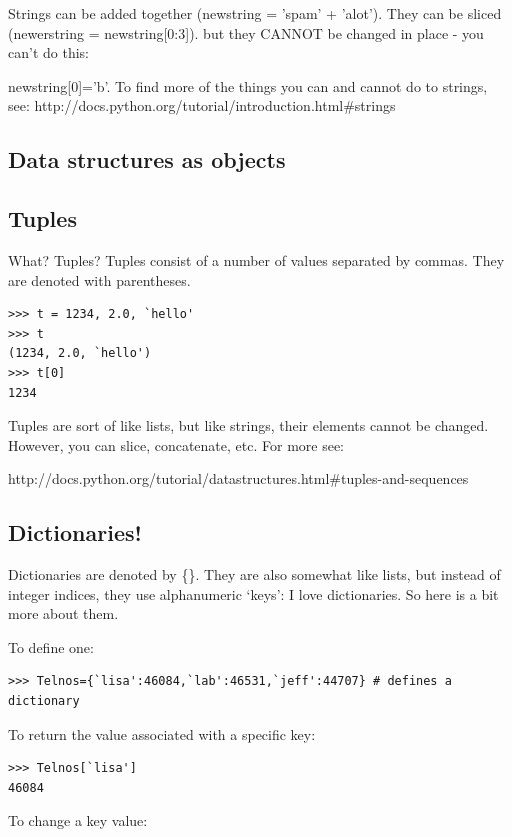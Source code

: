 \documentclass[11pt]{book}
\begin{document}
Strings can be added together ({\color{blue}newstring = 'spam' + 'alot'}).  They  can be sliced ({\color{blue}newerstring = newstring[0:3]}). 
but they CANNOT be changed in place - you can't do this: {{\color{blue}newstring[0]='b'}.
To find more of the things you can and cannot do to strings, see: http://docs.python.org/tutorial/introduction.html\#strings

\subsection{Data structures as objects}



\subsection{Tuples}
What?  Tuples?  
Tuples consist of a number of values separated by commas.  They are denoted with parentheses. 
{ \color{blue} \begin{verbatim}
>>> t = 1234, 2.0, `hello'
>>> t
(1234, 2.0, `hello')
>>> t[0]
1234
\end{verbatim}}

\noindent Tuples are sort of like lists, but like strings, their elements cannot be changed.  However, you can slice, concatenate, etc.
 For more see: 
 
 http://docs.python.org/tutorial/datastructures.html\#tuples-and-sequences




\subsection {Dictionaries!}

Dictionaries are denoted by \{\}.  They are also somewhat like lists, but instead of integer indices, they use alphanumeric `keys':
I love dictionaries.  So here is a bit more about them.

\noindent
To define one: 
{ \color{blue} \begin{verbatim}
>>> Telnos={`lisa':46084,`lab':46531,`jeff':44707} # defines a dictionary
\end{verbatim}}

\noindent
To return the value associated with a specific key:
{ \color{blue} \begin{verbatim}
>>> Telnos[`lisa']
46084
\end{verbatim}}

\noindent
 To change a key value:

}
\end{document}
